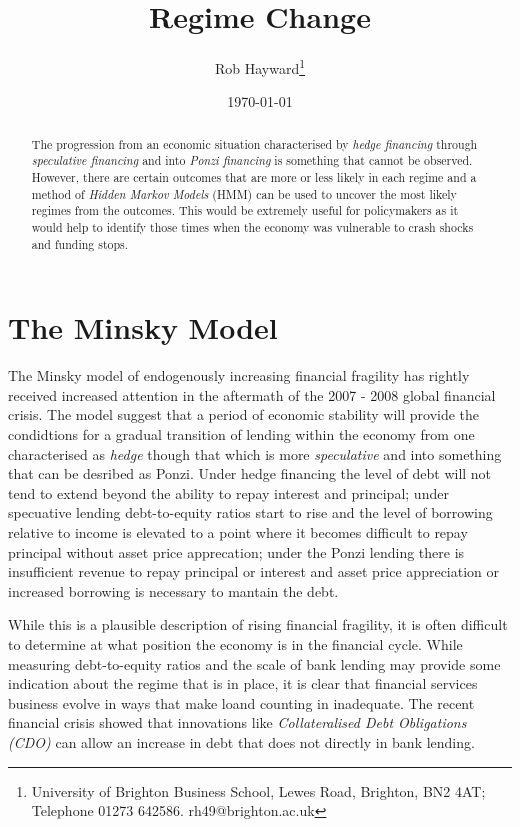 \documentclass[12pt, a4paper, oneside]{article} %
\begin{document}
\title{Regime Change}
\author{Rob Hayward\footnote{University of Brighton Business School, Lewes Road, Brighton, BN2 4AT; Telephone 01273 642586.  rh49@brighton.ac.uk}} 
\date{\today}
\maketitle
\begin{abstract}
The progression from an economic situation characterised by \emph{hedge financing} through \emph{speculative financing} and into \emph{Ponzi financing} is something that cannot be observed.  However, there are certain outcomes that are more or less likely in each regime and a method of \emph{Hidden Markov Models} (HMM) can be used to uncover the most likely regimes from the outcomes. This would be extremely useful for policymakers as it would help to identify those times when the economy was vulnerable to crash shocks and funding stops.  
\end{abstract}

\section{The Minsky Model}
The Minsky model of endogenously increasing financial fragility has rightly received increased attention in the aftermath of the 2007 - 2008 global financial crisis.  The model suggest that a period of economic stability will provide the condidtions for a gradual transition of lending within the economy from one characterised as \emph{hedge} though that which is more \emph{speculative} and into something that can be desribed as {Ponzi}.  Under hedge financing the level of debt will not tend to extend beyond the ability to repay interest and principal; under specuative lending debt-to-equity ratios start to rise and the level of borrowing relative to income is elevated to a point where it becomes difficult to repay principal without asset price apprecation; under the Ponzi lending there is insufficient revenue to repay principal or interest and asset price appreciation or increased borrowing is necessary to mantain the debt. 

While this is a plausible description of rising financial fragility, it is often difficult to determine at what position the economy is in the financial cycle.  While measuring debt-to-equity ratios and the scale of bank lending may provide some indication about the regime that is in place, it is clear that financial services business evolve in ways that make loand counting in inadequate. The recent financial crisis showed that innovations like \emph{Collateralised Debt Obligations (CDO)} can allow an increase in debt that does not directly in bank lending.  
\end{document}
